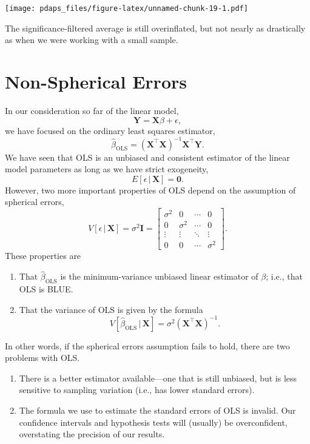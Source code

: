 \documentclass[12pt,oneside,openany]{book}
\begin{document}
\texttt{[image: pdaps\_files/figure-latex/unnamed-chunk-19-1.pdf]}

The significance-filtered average is still overinflated, but not nearly
as drastically as when we were working with a small sample.

\chapter{Non-Spherical Errors}\label{nonspherical}

In our consideration so far of the linear model, \[
\mathbf{Y} = \mathbf{X} \beta + \epsilon,
\] we have focused on the ordinary least squares estimator, \[
\hat{\beta}_{\text{OLS}} = (\mathbf{X}^\top \mathbf{X})^{-1} \mathbf{X}^\top \mathbf{Y}.
\] We have seen that OLS is an unbiased and consistent estimator of the
linear model parameters as long as we have strict exogeneity, \[
E[\epsilon \,|\, \mathbf{X}] = \mathbf{0}.
\] However, two more important properties of OLS depend on the
assumption of spherical errors, \[
V[\epsilon \,|\, \mathbf{X}] = \sigma^2 \mathbf{I} = \begin{bmatrix}
  \sigma^2 & 0 & \cdots & 0 \\
  0 & \sigma^2 & \cdots & 0 \\
  \vdots & \vdots & \ddots & \vdots \\
  0 & 0 & \cdots & \sigma^2
\end{bmatrix}.
\] These properties are

\begin{enumerate}
\def\labelenumi{\arabic{enumi}.}
\item
  That \(\hat{\beta}_{\text{OLS}}\) is the minimum-variance unbiased
  linear estimator of \(\beta\); i.e., that OLS is BLUE.
\item
  That the variance of OLS is given by the formula \[
  V[\hat{\beta}_{\text{OLS}} \,|\, \mathbf{X}] = \sigma^2 (\mathbf{X}^\top \mathbf{X})^{-1}.
  \]
\end{enumerate}

In other words, if the spherical errors assumption fails to hold, there
are two problems with OLS.

\begin{enumerate}
\def\labelenumi{\arabic{enumi}.}
\item
  There is a better estimator available---one that is still unbiased,
  but is less sensitive to sampling variation (i.e., has lower standard
  errors).
\item
  The formula we use to estimate the standard errors of OLS is invalid.
  Our confidence intervals and hypothesis tests will (usually) be
  overconfident, overstating the precision of our results.
\end{enumerate}
\end{document}
